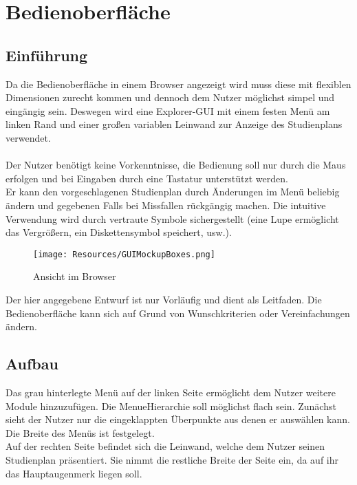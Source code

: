 \documentclass[parskip=full]{scrartcl}
\begin{document}
	\section{Bedienoberfläche}
		\subsection{Einführung}
	
			Da die Bedienoberfläche in einem Browser angezeigt wird muss diese mit flexiblen Dimensionen zurecht kommen und dennoch dem Nutzer möglichst simpel und eingängig sein.
			Deswegen wird eine Explorer-GUI mit einem festen Menü am linken Rand und einer großen variablen Leinwand zur Anzeige des Studienplans verwendet. 
			\\ \\

			Der Nutzer benötigt keine Vorkenntnisse, die Bedienung soll nur durch die Maus erfolgen und bei Eingaben durch eine Tastatur unterstützt werden. \\
			Er kann den vorgeschlagenen Studienplan durch Änderungen im Menü beliebig ändern und gegebenen Falls bei Missfallen rückgängig machen. Die intuitive Verwendung wird durch vertraute Symbole sichergestellt (eine Lupe ermöglicht das Vergrößern, ein Diskettensymbol speichert, usw.). \\
	
			\begin{figure}[h]
				\centering
				\texttt{[image: Resources/GUIMockupBoxes.png]}
				\caption{Ansicht im Browser}
				\label{fig:guimockup}
			\end{figure}
			\bigskip
			
			Der hier angegebene Entwurf ist nur Vorläufig und dient als Leitfaden. Die Bedienoberfläche kann sich auf Grund von Wunschkriterien oder Vereinfachungen ändern.\\
	
		\subsection{Aufbau}
			Das grau hinterlegte Menü auf der linken Seite ermöglicht dem Nutzer weitere Module hinzuzufügen. Die \gls{MenueHierarchie} soll möglichst flach sein. Zunächst sieht der Nutzer nur die eingeklappten Überpunkte aus denen er auswählen kann. Die Breite des Menüs ist festgelegt.
			\\

			Auf der rechten Seite befindet sich die Leinwand, welche dem Nutzer seinen Studienplan präsentiert. Sie nimmt die restliche Breite der Seite ein, da auf ihr das Hauptaugenmerk liegen soll.
			\\
			
\end{document}
